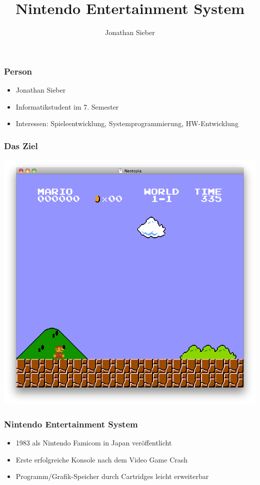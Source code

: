 \documentclass{beamer}
\title{Nintendo Entertainment System}
\author{Jonathan Sieber}
\begin{document}
    \maketitle
    \begin{frame}
    \frametitle{Person}
    \begin{itemize}
        \item{Jonathan Sieber}
        \item{Informatikstudent im 7. Semester}
        \item{Interessen: Spieleentwicklung, Systemprogrammierung, HW-Entwicklung}
    \end{itemize}
    \end{frame}
    
    
    \begin{frame}
        \frametitle{Das Ziel}
        \includegraphics[width=0.8\linewidth]{img/smb.png}
    \end{frame}
    
    \begin{frame}
        \frametitle{Nintendo Entertainment System}
        \begin{itemize}
            \item{1983 als Nintendo Famicom in Japan veröffentlicht}
            \item{Erste erfolgreiche Konsole nach dem Video Game Crash}
            \item{Programm/Grafik-Speicher durch Cartridges leicht erweiterbar}
        \end{itemize}
    \end{frame}
    
\end{document}
